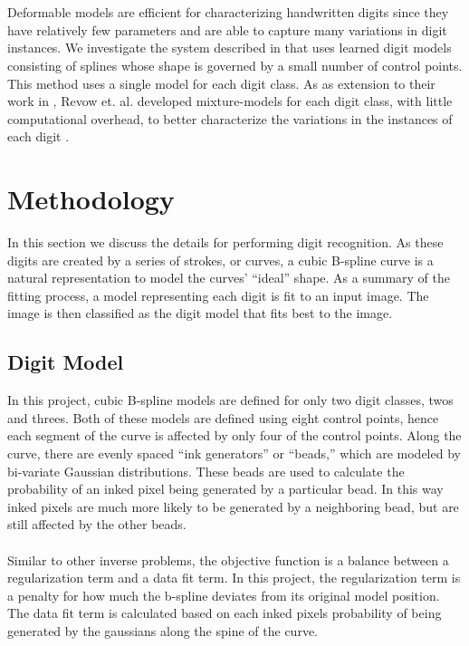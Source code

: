 \documentclass[oribibl]{llncs}
\begin{document}
\\
\\
Deformable models are efficient for characterizing handwritten digits since they have
relatively few parameters and are able to capture many variations in digit instances. We investigate the system described in \cite{Hinton92adaptiveelastic} that uses learned digit models consisting of splines whose shape is governed by a small number of control points. This method uses a single model for each digit class. As as extension to their work in \cite{Hinton92adaptiveelastic}, Revow et. al. developed mixture-models for each digit class, with little computational overhead, to better characterize the variations in the instances of each digit \cite{revow1993using}. 


\section{Methodology}
\label{sec:methodology}

In this section we discuss the details for performing digit recognition.
As these digits are created by a series of strokes, or curves, a cubic B-spline curve is a natural representation to model the curves' ``ideal'' shape. As a summary of the fitting process, a model representing each digit is fit to an input image. The image is then classified as the digit model that fits best to the image.

\subsection{Digit Model}
In this project, cubic B-spline models are defined for only two digit classes, twos and threes. Both of these models are defined using eight control points, hence each segment of the curve is affected by only four of the control points. Along the curve, there are evenly spaced ``ink generators'' or ``beads,'' which are modeled by bi-variate Gaussian distributions. These beads are used to calculate the probability of an inked pixel being generated by a particular bead. In this way inked pixels are much more likely to be generated by a neighboring bead, but are still affected by the other beads. 
\\
\\
Similar to other inverse problems, the objective function is a balance between a regularization term and a data fit term. In this project, the regularization term is a penalty for how much the b-spline deviates from its original model position. The data fit term is calculated based on each inked pixels probability of being generated by the gaussians along the spine of the curve. 
\end{document}
